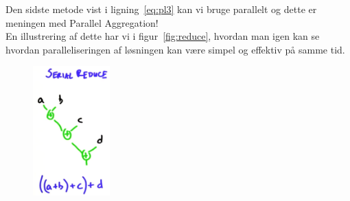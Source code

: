 Den sidste metode vist i ligning~\ref{eq:pl3} kan vi bruge parallelt og dette er meningen med Parallel Aggregation!\\

En illustrering af dette har vi i figur~\ref{fig:reduce}, hvordan man igen kan se hvordan paralleliseringen af løsningen kan være simpel og effektiv på samme tid.

\newcommand{\si}{5cm}
\begin{figure}[H]
	\centering
	\begin{minipage}{.49\textwidth}
		\centering
		\includegraphics[height=\si]{figs/aggregation/seqReduce}

\end{minipage}
\end{figure}
